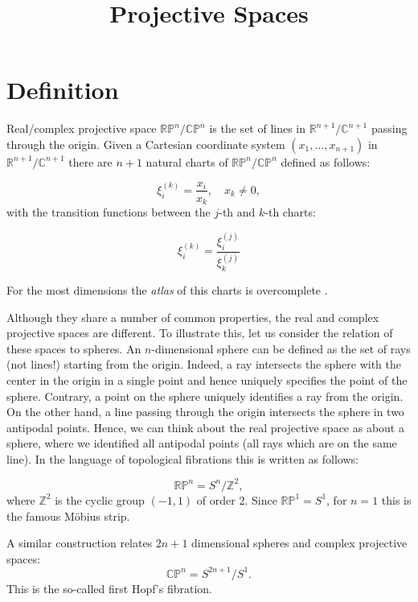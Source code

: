 \documentclass[a4paper,10pt]{article}
\title{Projective Spaces}
\author{}
\date{}
\begin{document}
\maketitle
\section{Definition}

Real/complex projective space $\mathbb{RP}^n/\mathbb{CP}^n$ is the set of lines in $\mathbb{R}^{n+1}/\mathbb{C}^{n+1}$ passing through the origin. Given a Cartesian coordinate system $(x_1,\ldots, x_{n+1})$ in $\mathbb{R}^{n+1}/\mathbb{C}^{n+1}$ there are $n+1$ natural charts of $\mathbb{RP}^n/\mathbb{CP}^n$ defined as follows:

\begin{equation}
 \xi_i^{(k)} = \frac{x_i}{x_k}, \quad x_k\neq 0 \label{chartk},
\end{equation}
with the transition functions between the $j$-th and $k$-th charts:

\begin{equation}
 \xi^{(k)}_i = \frac{\xi^{(j)}_i }{\xi^{(j)}_k }
\end{equation}

For the most dimensions the {\it atlas } of this charts is overcomplete \cite{mhopkins}.

Although they share a number of common properties, the real and complex projective spaces are different. To illustrate this, let us consider the relation of these spaces to spheres. An $n$-dimensional sphere can be defined as the set of rays (not lines!) starting from the origin. Indeed, a ray intersects the sphere with the center in the origin in a single point and hence uniquely specifies the point of the sphere. Contrary, a point on the sphere uniquely identifies a ray from the origin. On the other hand, a line passing through the origin intersects the sphere in two antipodal points. Hence, we can think about the real projective space as about a sphere, where we identified all antipodal points (all rays which are on the same line). In the language of topological fibrations this is written as follows:

\begin{equation}
\mathbb{RP}^n = S^{n}/\mathbb{Z}^2,
\end{equation} 
where $\mathbb{Z}^2$ is the cyclic group $(-1,1)$ of order 2. Since $\mathbb{RP}^1 = S^1$, for $n=1$ this is the famous M\"obius strip.

A similar construction relates $2n+1$ dimensional spheres and complex projective spaces:
\begin{equation}
\mathbb{CP}^n = S^{2n+1}/S^1.
\end{equation}
This is the so-called first Hopf's fibration.
\end{document}
